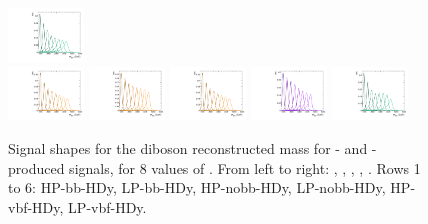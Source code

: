 \begin{figure}[htbp]
  \includegraphics[width=0.18\textwidth]{fig/analysisAppendix/templateSignalVsMX_fromDC_WprToWH_MVV_mu_HP_vbf_HDy.pdf}\\
  \includegraphics[width=0.18\textwidth]{fig/analysisAppendix/templateSignalVsMX_fromDC_GbuToWW_MVV_mu_LP_vbf_HDy.pdf}
  \includegraphics[width=0.18\textwidth]{fig/analysisAppendix/templateSignalVsMX_fromDC_RadToWW_MVV_mu_LP_vbf_HDy.pdf}
  \includegraphics[width=0.18\textwidth]{fig/analysisAppendix/templateSignalVsMX_fromDC_ZprToWW_MVV_mu_LP_vbf_HDy.pdf}
  \includegraphics[width=0.18\textwidth]{fig/analysisAppendix/templateSignalVsMX_fromDC_WprToWZ_MVV_mu_LP_vbf_HDy.pdf}
  \includegraphics[width=0.18\textwidth]{fig/analysisAppendix/templateSignalVsMX_fromDC_WprToWH_MVV_mu_LP_vbf_HDy.pdf}\\
  \caption{
    Signal shapes for the diboson reconstructed mass \MVV for \ggF- and \DY-produced signals, for 8 values of \MX.
    From left to right: \GBulktoWW, \RadtoWW, \ZprtoWW, \WprtoWZ, \WprtoWH.
    Rows 1 to 6: HP-bb-HDy, LP-bb-HDy, HP-nobb-HDy, LP-nobb-HDy, HP-vbf-HDy, LP-vbf-HDy.
  }
  \label{fig:MVVShapes_NonVBF_HDy}
\end{figure}

